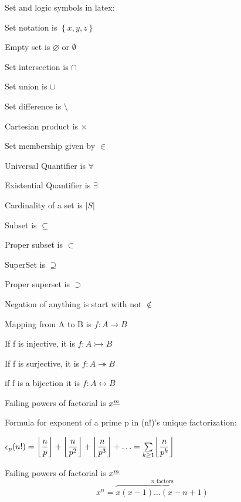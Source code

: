 \documentclass{article}
\begin{document}
Set and logic symbols in latex:

Set notation is $\left\{ {x,y,z} \right\}$

Empty set is $\varnothing$ or $\emptyset$

Set intersection is $\cap$

Set union is $\cup$

Set difference is $\setminus$

Cartesian product is $\times$

Set membership given by $\in$

Universal Quantifier is $\forall$

Existential Quantifier is $\exists$

Cardinality of a set is $\left\vert{S}\right\vert$

Subset is $\subseteq$

Proper subset is $\subset$

SuperSet is $\supseteq$

Proper superset is $\supset$

Negation of anything is start with not $\not \in$

Mapping from A to B is $f: A \to B$

If f is injective, it is $f: A \rightarrowtail B$

If f is surjective, it is $f: A \twoheadrightarrow B$

if f is a bijection it is $f: A \leftrightarrow B$

Failing powers of factorial is $x^{\uline{m}}$

Formula for exponent of a prime p in (n!)'s unique factorization:

\DeclarePairedDelimiter{\ceil}{\lceil}{\rceil}
\DeclarePairedDelimiter{\floor}{\lfloor}{\rfloor}

$\epsilon_p(n!) = \floor*{\dfrac{n}{p}} + \floor*{\dfrac{n}{p^2}} +\floor*{\dfrac{n}{p^3}}
+ \hdots = \sum\limits_{k\geq1} \floor*{\dfrac{n}{p^k}} $


\newcommand{\fallingfactorial}[1]{%
  ^{\underline{#1}}%
}


Failing powers of factorial is $x^{\uline{m}}$
\[
x\fallingfactorial{n}={\overbrace{x(x-1)\dots(x-n+1)}^{\text{$n$ factors}}}
\]
\end{document}
